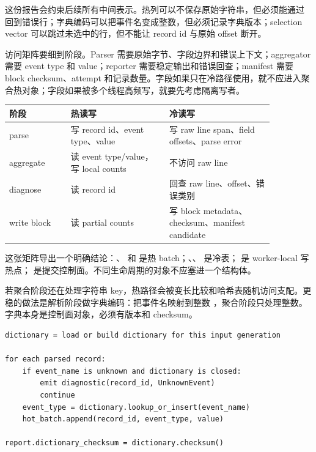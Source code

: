 这份报告会约束后续所有中间表示。热列可以不保存原始字符串，但必须能通过  回到错误行；字典编码可以把事件名变成整数，但必须记录字典版本；selection vector 可以跳过未选中的行，但不能让 record id 与原始 offset 断开。

访问矩阵要细到阶段。Parser 需要原始字节、字段边界和错误上下文；aggregator 需要 event type 和 value；reporter 需要稳定输出和错误回查；manifest 需要 block checksum、attempt 和记录数量。字段如果只在冷路径使用，就不应进入聚合热对象；字段如果被多个线程高频写，就要先考虑隔离写者。

\begin{center}
\begin{tabular}{p{0.20\linewidth}p{0.32\linewidth}p{0.34\linewidth}}
\toprule
阶段 & 热读写 & 冷读写 \\
\midrule
parse & 写 record id、event type、value & 写 raw line span、field offsets、parse error \\
aggregate & 读 event type/value，写 local counts & 不访问 raw line \\
diagnose & 读 record id & 回查 raw line、offset、错误类别 \\
write block & 读 partial counts & 写 block metadata、checksum、manifest candidate \\
\bottomrule
\end{tabular}
\end{center}

这张矩阵导出一个明确结论：、 和  是热 batch；、、 是冷表； 是 worker-local 写热点； 是提交控制面。不同生命周期的对象不应塞进一个结构体。

若聚合阶段还在处理字符串 key，热路径会被变长比较和哈希表随机访问支配。更稳的做法是解析阶段做字典编码：把事件名映射到整数 ，聚合阶段只处理整数。字典本身是控制面对象，必须有版本和 checksum。

\begin{lstlisting}[numbers=none,caption={字典编码的语义伪代码}]
dictionary = load or build dictionary for this input generation

for each parsed record:
    if event_name is unknown and dictionary is closed:
        emit diagnostic(record_id, UnknownEvent)
        continue
    event_type = dictionary.lookup_or_insert(event_name)
    hot_batch.append(record_id, event_type, value)

report.dictionary_checksum = dictionary.checksum()
\end{lstlisting}

